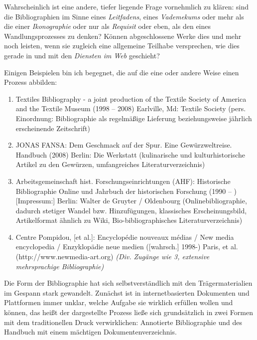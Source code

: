 \documentclass[a4paper,
fontsize=11pt,
oneside,
numbers=noperiodatend,
parskip=half-,
bibliography=totoc,
final
]{scrartcl}
\begin{document}
Wahrscheinlich ist eine andere, tiefer liegende Frage vornehmlich zu
klären: sind die Bibliographien im Sinne eines \emph{Leitfadens}, eines
\emph{Vademekums} oder mehr als die einer \emph{Ikonographie} oder nur
als \emph{Requisit} oder eben, als den eines Wandlungsprozesses zu
denken? Können abgeschlossene Werke dies und mehr noch leisten, wenn sie
zugleich eine allgemeine Teilhabe versprechen, wie dies gerade in und
mit den \emph{Diensten im Web} geschieht?

Einigen Beispielen bin ich begegnet, die auf die eine oder andere Weise
einen Prozess abbilden:

\begin{enumerate}
\def\labelenumi{\arabic{enumi}.}
\item
  Textiles Bibliography - a joint production of the Textile Society of
  America and the Textile Museum (1998 -- 2008) Earlville, Md: Textile
  Society (pers. Einordnung: Bibliographie als regelmäßige Lieferung
  beziehungsweise jährlich erscheinende Zeitschrift)
\item
  JONAS FANSA: Dem Geschmack auf der Spur. Eine Gewürzweltreise.
  Handbuch (2008) Berlin: Die Werkstatt (kulinarische und
  kulturhistorische Artikel zu den Gewürzen, umfangreiches
  Literaturverzeichnis)
\item
  Arbeitsgemeinschaft hist. Forschungseinrichtungen (AHF): Historische
  Bibliographie Online und Jahrbuch der historischen Forschung (1990 --
  ) {[}Impressum:{]} Berlin: Walter de Gruyter / Oldenbourg
  (Onlinebibliographie, dadurch stetiger Wandel bzw. Hinzufügungen,
  klassisches Erscheinungsbild, Artikelformat ähnlich zu Wiki,
  Bio-bibliographisches Literaturverzeichnis)
\item
  Centre Pompidou, {[}et al.{]}: Encyclopédie nouveaux médias / New
  media encyclopedia / Enzyklopädie neue medien ({[}wahrsch.{]} 1998-)
  Paris, et al. (http://www.newmedia-art.org) \emph{(Div. Zugänge wie 3,
  extensive mehrsprachige Bibliographie)}
\end{enumerate}

Die Form der Bibliographie hat sich selbstverständlich mit den
Trägermaterialien im Gespann stark gewandelt. Zunächst ist in
internetbasierten Dokumenten und Plattformen immer unklar, welche
Aufgabe sie wirklich erfüllen wollen und können, das heißt der
dargestellte Prozess ließe sich grundsätzlich in zwei Formen mit dem
traditionellen Druck verwirklichen: Annotierte Bibliographie und des
Handbuch mit einem mächtigen Dokumentenverzeichnis.
\end{document}
